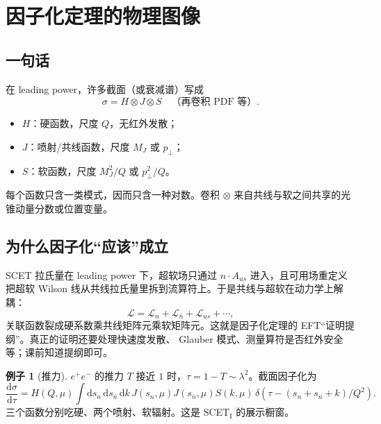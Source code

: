 \documentclass[11pt,a4paper]{article}
\theoremstyle{definition}
\newtheorem{example}{例子}[section]
\theoremstyle{plain}
\theoremstyle{remark}
\newcommand{\dd}{\mathrm{d}}
\begin{document}
\section{因子化定理的物理图像}
\label{sec:fact}

\subsection{一句话}

在 leading power，许多截面（或衰减谱）写成
\begin{equation}
\label{eq:fact}
  \sigma=H\otimes J\otimes S
  \quad\text{（再卷积 PDF 等）}.
\end{equation}
\begin{itemize}[leftmargin=1.4em]
  \item $H$：硬函数，尺度 $Q$，无红外发散；
  \item $J$：喷射/共线函数，尺度 $M_J$ 或 $p_\perp$；
  \item $S$：软函数，尺度 $M_J^2/Q$ 或 $p_\perp^2/Q$。
\end{itemize}
每个函数只含一类模式，因而只含一种对数。卷积 $\otimes$ 来自共线与软之间共享的光锥动量分数或位置变量。

\subsection{为什么因子化``应该''成立}

SCET 拉氏量在 leading power 下，超软场只通过 $n\cdot A_{us}$ 进入，且可用场重定义把超软 Wilson 线从共线拉氏量里拆到流算符上。于是共线与超软在动力学上解耦：
\begin{equation}
  \mathcal{L}=\mathcal{L}_n+\mathcal{L}_{\bar n}+\mathcal{L}_{us}+\cdots,
\end{equation}
关联函数裂成硬系数乘共线矩阵元乘软矩阵元。这就是因子化定理的 EFT``证明提纲''。真正的证明还要处理快速度发散、 Glauber 模式、测量算符是否红外安全等；课前知道提纲即可。

\begin{example}[推力]
$e^+e^-$ 的推力 $T$ 接近 $1$ 时，$\tau=1-T\sim\lambda^2$。截面因子化为
\begin{equation}
  \frac{\dd\sigma}{\dd\tau}=H(Q,\mu)\int\dd s_n\,\dd s_{\bar n}\,\dd k\,
  J(s_n,\mu)J(s_{\bar n},\mu)S(k,\mu)\,\delta(\tau-(s_n+s_{\bar n}+k)/Q^2).
\end{equation}
三个函数分别吃硬、两个喷射、软辐射。这是 SCET$_{\mathrm I}$ 的展示橱窗。
\end{example}
\end{document}
